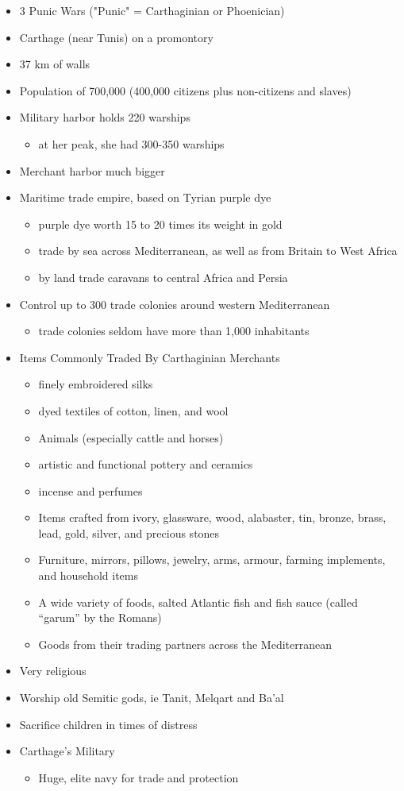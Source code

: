 \documentclass[12pt, twoside]{article}
\begin{document}
\begin{itemize}
\item 3 Punic Wars ("Punic" = Carthaginian or Phoenician)
\item Carthage (near Tunis) on a promontory 
\item 37 km of walls
\item Population of  700,000 (400,000 citizens plus non-citizens and slaves)
\item Military harbor holds 220 warships 
	\begin{itemize}
	\item at her peak, she had 300-350 warships
	\end{itemize}
\item Merchant harbor much bigger
\item Maritime trade empire, based on Tyrian purple dye
	\begin{itemize} 
	\item purple dye worth 15 to 20 times its weight in gold
	\item trade by sea across Mediterranean, as well as from Britain to West Africa
	\item by land trade caravans to central Africa and Persia
	\end{itemize}
\item Control up to 300 trade colonies around western Mediterranean
	\begin{itemize}
	\item trade colonies seldom have more than 1,000 inhabitants
	\end{itemize}
\item Items Commonly Traded By Carthaginian Merchants
	\begin{itemize}		
	\item finely embroidered silks
	\item dyed textiles of cotton, linen, and wool
	\item Animals (especially cattle and horses)
	\item artistic and functional pottery and ceramics
	\item incense and perfumes
	\item Items crafted from ivory, glassware, wood, alabaster, tin, bronze, brass, lead, gold, silver, and precious stones
	\item Furniture, mirrors, pillows, jewelry, arms, armour, farming implements, and household items
	\item A wide variety of foods, salted Atlantic fish and fish sauce (called “garum” by the Romans)  
	\item Goods from their trading partners across the Mediterranean 
	\end{itemize}
\item Very religious
\item Worship old Semitic gods, ie Tanit, Melqart and Ba’al
\item Sacrifice children in times of distress
\item Carthage’s Military
	\begin{itemize}
	\item Huge, elite navy for trade and protection


\end{itemize}
\end{itemize}
\end{document}
